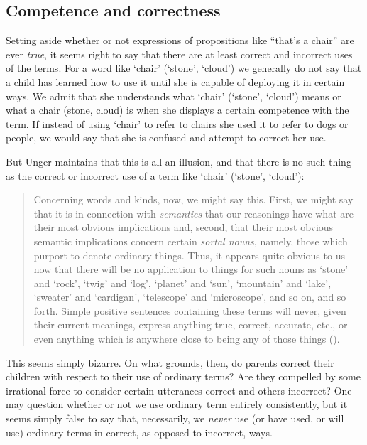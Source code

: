 \documentclass[11pt]{article}
\newenvironment{squote}{%
	\begin{quote}\begin{singlespace}%
	}{%
	\end{singlespace}\end{quote}}
\begin{document}
\begin{spacing}{1.5}
\subsection{Competence and correctness}
\label{correct}
Setting aside whether or not expressions of propositions like ``that's
a chair'' are ever \emph{true}, it seems right to say that there are
at least correct and incorrect uses of the terms.  For a word like
`chair' (`stone', `cloud') we generally do not say that a child has
learned how to use it until she is capable of deploying it in certain
ways.  We admit that she understands what `chair' (`stone', `cloud')
means or what a chair (stone, cloud) is when she displays a certain
competence with the term.  If instead of using `chair' to refer to
chairs she used it to refer to dogs or people, we would say that she
is confused and attempt to correct her use.

But Unger maintains that this is all an illusion, and that there is no
such thing as the correct or incorrect use of a term like `chair'
(`stone', `cloud'):

\begin{squote}
Concerning words and kinds, now, we might say this.  First, we might
say that it is in connection with \emph{semantics} that our reasonings have
what are their most obvious implications and, second, that their most
obvious semantic implications concern certain \emph{sortal nouns}, namely,
those which purport to denote ordinary things.  Thus, it appears quite
obvious to us now that there will be no application to things for such
nouns as `stone' and `rock', `twig' and `log', `planet' and `sun',
`mountain' and `lake', `sweater' and `cardigan', `telescope' and
`microscope', and so on, and so forth.  Simple positive sentences
containing these terms will never, given their current meanings,
express anything true, correct, accurate, etc., or even anything which
is anywhere close to being any of those things
(\citeyear[148]{unger1979}).
\end{squote}

This seems simply bizarre.  On what grounds, then, do parents correct
their children with respect to their use of ordinary terms?  Are they
compelled by some irrational force to consider certain utterances
correct and others incorrect?  One may question whether or not we use
ordinary term entirely consistently, but it seems simply false to say that,
necessarily, we {\em never} use (or have used, or will use) ordinary
terms in correct, as opposed to incorrect, ways.  


\end{spacing}
\end{document}
